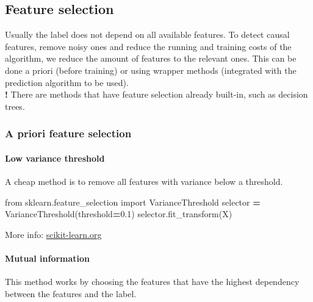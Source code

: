 \documentclass[
]{book}
\newenvironment{Shaded}{\begin{snugshade}}{\end{snugshade}}
\newcommand{\FloatTok}[1]{\textcolor[rgb]{0.00,0.00,0.81}{#1}}
\newcommand{\ImportTok}[1]{#1}
\newcommand{\NormalTok}[1]{#1}
\newcommand{\OperatorTok}[1]{\textcolor[rgb]{0.81,0.36,0.00}{\textbf{#1}}}
\begin{document}
\hypertarget{feature-selection}{%
\subsection{Feature selection}\label{feature-selection}}

Usually the label does not depend on all available features. To detect
causal features, remove noisy ones and reduce the running and training
costs of the algorithm, we reduce the amount of features to the relevant
ones. This can be done a priori (before training) or using wrapper
methods (integrated with the prediction algorithm to be used).\\
\textbf{!} There are methods that have feature selection already built-in,
such as decision trees.

\hypertarget{a-priori-feature-selection}{%
\subsubsection{A priori feature selection}\label{a-priori-feature-selection}}

\hypertarget{low-variance-threshold}{%
\paragraph{Low variance threshold}\label{low-variance-threshold}}

A cheap method is to remove all features with variance below a
threshold.

\begin{Shaded}
\begin{Highlighting}[]
\ImportTok{from}\NormalTok{ sklearn.feature\_selection }\ImportTok{import}\NormalTok{ VarianceThreshold}
\NormalTok{selector }\OperatorTok{=}\NormalTok{ VarianceThreshold(threshold}\OperatorTok{=}\FloatTok{0.1}\NormalTok{)}
\NormalTok{selector.fit\_transform(X)}
\end{Highlighting}
\end{Shaded}

More info:
\href{https://scikit-learn.org/stable/modules/generated/sklearn.feature_selection.VarianceThreshold.html\#sklearn.feature_selection.VarianceThreshold}{scikit-learn.org}

\hypertarget{mutual_info}{%
\paragraph{Mutual information}\label{mutual_info}}

This method works by choosing the features that have the highest
dependency between the features and the label.
\end{document}
